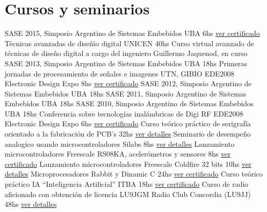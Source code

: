 \documentclass[11pt,a4paper,sans]{moderncv} 	%
\begin{document}
\section{Cursos y seminarios}
 		{SASE 2015, Simposio Argentino de Sistemas Embebidos}				{UBA} 						{6hs} 	{\href{http://disenioconingenio.com.ar/producto.php?products_id=411}{ver certificado}}	{}{} 
 		{Técnicas avanzadas de diseñio digital}						{UNICEN} 					{40hs} 	{Curso virtual avanzado de técnicas de diseño digital a cargo del ingeniero Guillermo Jaquenod, en curso} {}{}
 		{SASE 2013, Simposio Argentino de Sistemas Embebidos}				{UBA} 						{18hs} 	{} 											{}{}
 		{Primeras jornadas de procesamiento de señales e imagenes}			{UTN, GIBIO EDE2008 Electronic Design Expo} 	{8hs}  	{\href{http://disenioconingenio.com.ar/producto.php?products_id=396}{ver certificado}} 	{}{}
 		{SASE 2012, Simposio Argentino de Sistemas Embebidos}				{UBA} 						{18hs} 	{} 											{}{}
 		{SASE 2011, Simposio Argentino de Sistemas Embebidos}				{UBA} 						{18hs} 	{} 											{}{}
 		{SASE 2010, Simposio Argentino de Sistemas Embebidos}				{UBA} 						{18hs} 	{} 											{}{}
 		{Conferencia sobre tecnologías inalámbricas de Digi RF}				{EDE2008 Electronic Design Expo} 		{6hs}  	{\href{http://disenioconingenio.com.ar/producto.php?products_id=394}{ver certificado}} 	{}{}
 		{Curso teórico práctico de serigrafía orientado a la fabricación de PCB's}	{32hs} 				 			{\href{http://disenioconingenio.com.ar/producto.php?products_id=389}{ver detalles}} 	{}{}
 		{Seminario de desempeño analogico usando microcontroladores Silabs}		{8hs} 				 			{\href{http://disenioconingenio.com.ar/producto.php?products_id=395}{ver detalles}} 	{}{}
 		{Lanzamiento microcontroladores Freescale RS08KA, acelerómetros y sensores} 	{8hs} 							{\href{http://disenioconingenio.com.ar/producto.php?products_id=384}{ver certificado}} 	{}{}
 		{Lanzamiento microcontroladores Freescale Coldfire 32 bits} 			{10hs}			 				{\href{http://disenioconingenio.com.ar/producto.php?products_id=385}{ver detalles}} 	{}{}
 		{Microprocesadores Rabbit y Dinamic C} 						{24hs}			 				{\href{http://disenioconingenio.com.ar/producto.php?products_id=386}{ver certificado}} 	{}{}
 		{Curso teórico práctico IA “Inteligencia Artificial”} 				{ITBA} 						{18hs} 	{\href{http://disenioconingenio.com.ar/producto.php?products_id=387}{ver certificado}} 	{}{}
 		{Curso de radio aficionado con obtención de licencia LU9JGM} 			{Radio Club Concordia (LU9JJ)} 			{48hs} 	{\href{http://disenioconingenio.com.ar/producto.php?products_id=388}{ver detalles}} 	{}{}
\end{document}
